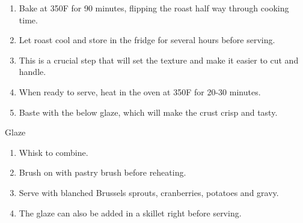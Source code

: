 \begin{footnotesize}
\begin{enumerate}
    \item Bake at 350F for 90 minutes, flipping the roast half way through cooking time.
    \item Let roast cool and store in the fridge for several hours before serving. 
    \item This is a crucial step that will set the texture and make it easier to cut and handle.
    \item When ready to serve, heat in the oven at 350F for 20-30 minutes.

    \item Baste with the below glaze, which will make the crust crisp and tasty.
\end{enumerate}

Glaze
\begin{enumerate}
    \item Whisk to combine. 
    \item Brush on with pastry brush before reheating.
    \item Serve with blanched Brussels sprouts, cranberries, potatoes and gravy.

    \item The glaze can also be added in a skillet right before serving.
\end{enumerate}
\end{footnotesize}

\vspace{2em}
